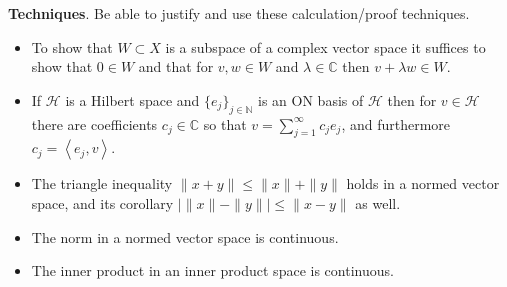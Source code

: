 \documentclass[12pt]{amsart}
\newcommand{\normalspacing}{\renewcommand{\baselinestretch}{1.1}\tiny\normalsize}
\newcommand{\cH}{\mathcal{H}}
\newcommand{\CC}{{\mathbb{C}}}
\newcommand{\NN}{{\mathbb{N}}}
\newcommand{\ip}[2]{\left<#1,#2\right>}
\newcommand{\ds}{\displaystyle}
\begin{document}
\normalspacing
\medskip
\noindent \textbf{Techniques}.  Be able to justify and use these calculation/proof techniques.
\begin{itemize}
\item To show that $W\subset X$ is a subspace of a complex vector space it suffices to show that $0\in W$ and that for $v,w\in W$ and $\lambda \in \CC$ then $v + \lambda w \in W$.
\item If $\cH$ is a Hilbert space and $\{e_j\}_{j\in\NN}$ is an ON basis of $\cH$ then for $v\in\cH$  there are coefficients $c_j\in\CC$ so that $\ds v = \sum_{j=1}^\infty c_j e_j$, and furthermore $c_j=\ip{e_j}{v}$.
\item The triangle inequality $\|x+y\|\le \|x\|+\|y\|$ holds in a normed vector space, and its corollary $\big|\|x\|-\|y\|\big| \le \|x-y\|$ as well.
\item The norm in a normed vector space is continuous.
\item The inner product in an inner product space is continuous.
\end{itemize}
\end{document}
